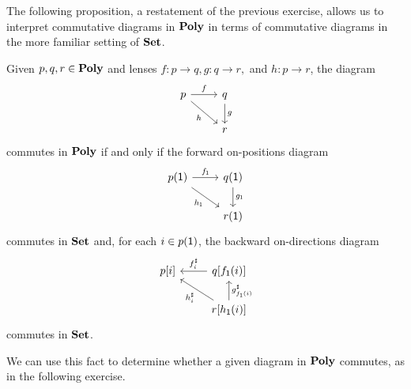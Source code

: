 \documentclass[Book-Poly]{subfiles}
\begin{document}

The following proposition, a restatement of the previous exercise, allows us to interpret commutative diagrams in $\mathbf{Poly}$ in terms of commutative diagrams in the more familiar setting of $\mathbf{Set}$.

\begin{proposition} \label{prop.comm_poly}
Given $p,q,r\in\mathbf{Poly}$ and lenses $f\colon p\to q, g\colon q\to r,$ and $h\colon p\to r$, the diagram
\[
\begin{tikzcd}
    p \ar[r, "f"] \ar[dr, "h"'] & q \ar[d, "g"] \\
    & r
\end{tikzcd}
\]
commutes in $\mathbf{Poly}$ if and only if the forward on-positions diagram
\[
\begin{tikzcd}
    p(\1) \ar[r, "f_\1"] \ar[dr, "h_\1"'] & q(\1) \ar[d, "g_\1"] \\
    & r(\1)
\end{tikzcd}
\]
commutes in $\mathbf{Set}$ and, for each $i \in p(\textsf{1})$, the backward on-directions diagram
\[
\begin{tikzcd}
    p[i] & q[f_\1(i)] \ar[l, "f^\sharp_i"'] \\
    & r[h_\1(i)] \ar[u, "g^\sharp_{f_\1(i)}"'] \ar[ul, "h^\sharp_i"]
\end{tikzcd}
\]
commutes in $\mathbf{Set}$.
\end{proposition}

We can use this fact to determine whether a given diagram in $\mathbf{Poly}$ commutes, as in the following exercise.
\end{document}
